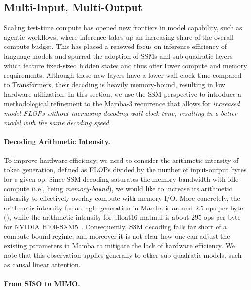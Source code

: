 \subsection{Multi-Input, Multi-Output}
\label{sec:method:mimo}

Scaling test-time compute has opened new frontiers in model capability, such as agentic workflows, where inference takes up an increasing share of the overall compute budget.
This has placed a renewed focus on inference efficiency of language models and spurred the adoption of SSMs and sub-quadratic layers which feature fixed-sized hidden states and thus offer lower compute and memory requirements.
Although these new layers have a lower wall-clock time compared to Transformers, their decoding is heavily memory-bound, resulting in low hardware utilization.
In this section, we use the SSM perspective to introduce a methodological refinement to the Mamba-3 recurrence that allows for \emph{increased model FLOPs without increasing decoding wall-clock time, resulting in a better model with the same decoding speed.}

\paragraph{Decoding Arithmetic Intensity.}
To improve hardware efficiency, we need to consider the arithmetic intensity of token generation, 
defined as FLOPs divided by the number of input-output bytes for a given op. 
Since SSM decoding saturates the memory bandwidth with idle compute (i.e., being \textit{memory-bound}), we would like to increase its arithmetic intensity to effectively overlay compute with memory I/O.
More concretely, the arithmetic intensity for a single generation in Mamba is around $2.5$ ops per byte (), while the arithmetic intensity for bfloat16 matmul is about $295$ ops per byte for NVIDIA H100-SXM5~\citep{nvidia_h100_2022}. Consequently, SSM decoding falls far short of a compute-bound regime, and moreover it is not clear how one can adjust the existing parameters in Mamba to mitigate the lack of hardware efficiency. 
We note that this observation applies generally to other sub-quadratic models, such as causal linear attention.



\paragraph{From SISO to MIMO.}

